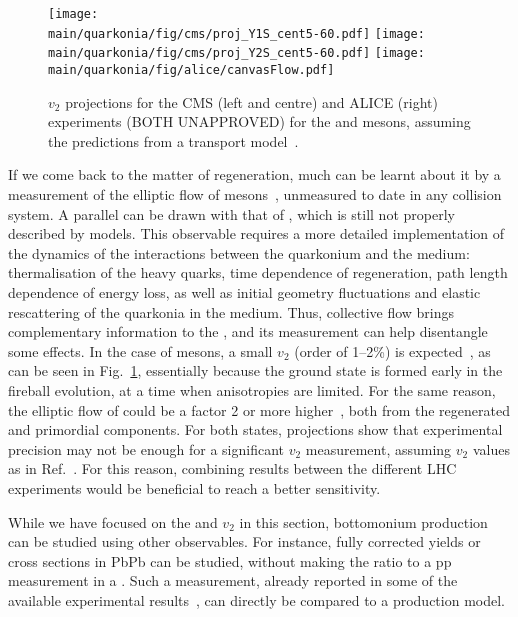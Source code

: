 \documentclass[../report.tex]{subfiles}
\providecommand{\main}{..}
\begin{document}
\begin{figure}
\begin{center}
 \texttt{[image: \\main/quarkonia/fig/cms/proj\_Y1S\_cent5-60.pdf]}
 \texttt{[image: \\main/quarkonia/fig/cms/proj\_Y2S\_cent5-60.pdf]}
 \texttt{[image: \\main/quarkonia/fig/alice/canvasFlow.pdf]}
\end{center}

 \caption{$v_2$ projections for the CMS (left and centre) and ALICE (right) experiments (BOTH UNAPPROVED) for the  and  mesons, assuming the predictions from a transport model~\cite{Du:2017qkv}.}
 \label{fig:upsi_v2}
\end{figure}

If we come back to the matter of regeneration, much can be learnt about it by a measurement of the elliptic flow of  mesons~\cite{Das:2018xel}, 
unmeasured to date in any collision system. 
A parallel can be
drawn with that of \PJgy, which is still not properly described by models. This observable requires a more detailed implementation of the dynamics of the interactions between the 
quarkonium and the medium: thermalisation of the heavy quarks, time dependence of regeneration, path length dependence of energy loss, as well as initial geometry fluctuations and 
elastic rescattering of the quarkonia in the medium. Thus, collective flow brings complementary information to the \raa, and its measurement can help disentangle some
effects. In the case of  mesons, a small $v_2$ (order of 1--2\%) is expected~\cite{Du:2017qkv,Yao:2018zrg}, as can be seen in Fig.~\ref{fig:upsi_v2},
essentially because the ground state is formed early in the fireball evolution, at a time when 
anisotropies are limited. For the same reason, the elliptic flow of  could be a factor 2 or more higher~\cite{Du:2017qkv}, both from the regenerated and primordial
components. For both states, projections show that experimental precision may not be enough for a significant $v_2$ measurement, assuming $v_2$ values as in Ref.~\cite{Du:2017qkv}. For this reason,
combining results between the different LHC experiments would be beneficial to reach a better sensitivity.

While we have focused on the \raa and $v_2$ in this section, bottomonium production can be studied using other observables. For instance, fully corrected yields or cross sections
in PbPb can be studied, without making the ratio to a pp measurement in a \raa. Such a measurement, already reported in some of the available experimental results~\cite{Sirunyan:2018nsz},
can directly be compared to a production model. 
\end{document}
